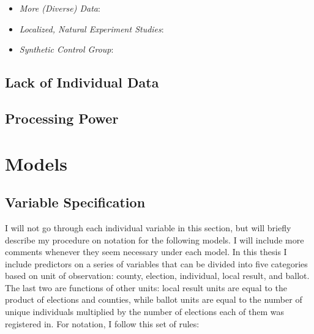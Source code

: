 \documentclass[12pt,twoside]{reedthesis}
\begin{document}
  \begin{itemize}
  \item
    \emph{More (Diverse) Data}:
  \item
    \emph{Localized, Natural Experiment Studies}:
  \item
    \emph{Synthetic Control Group}:
  \end{itemize}
  
  \subsection{Lack of Individual Data}\label{lack-of-individual-data}
  
  \subsection{Processing Power}\label{processing-power}
  
  \section{Models}\label{models}
  
  \subsection{Variable Specification}\label{variable-specification}
  
  I will not go through each individual variable in this section, but will
  briefly describe my procedure on notation for the following models. I
  will include more comments whenever they seem necessary under each
  model. In this thesis I include predictors on a series of variables that
  can be divided into five categories based on unit of observation:
  county, election, individual, local result, and ballot. The last two are
  functions of other units: local result units are equal to the product of
  elections and counties, while ballot units are equal to the number of
  unique individuals multiplied by the number of elections each of them
  was registered in. For notation, I follow this set of rules:
  
\end{document}
